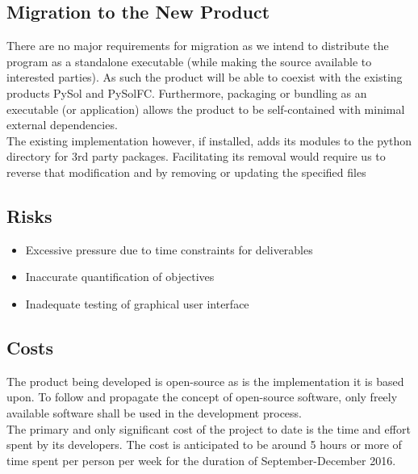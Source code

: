 \documentclass[12pt, titlepage]{article}
\begin{document}
		\subsection{Migration to the New Product}
			\indent There are no major requirements for migration as we intend to
			distribute the program as a standalone executable (while making the source
			available to interested parties). As such the product will be able to coexist
			with the existing products PySol and PySolFC. Furthermore, packaging
			or bundling as an executable (or application) allows the product to be
			self-contained with minimal external dependencies.\\
			\indent The existing implementation however, if installed, adds its modules
			to the python directory for 3rd party packages. Facilitating its removal
			would require us to reverse that modification and by removing or updating
			the specified files\\

		\subsection{Risks}
		\begin{itemize}
			\itemsep0em
			\item Excessive pressure due to time constraints for deliverables
			\item Inaccurate quantification of objectives
			\item Inadequate testing of graphical user interface
		\end{itemize}

		\subsection{Costs}
			\indent The product being developed is open-source as is the implementation
			it is based upon. To follow and propagate the concept of open-source
			software, only freely available software shall be used in the development
			process.\\
			\indent The primary and only significant cost of the project to date is the
			time and effort spent by its developers. The cost is anticipated to be around
			5 hours or more of time spent per person per week for the duration of
			September-December 2016.\\
\end{document}
